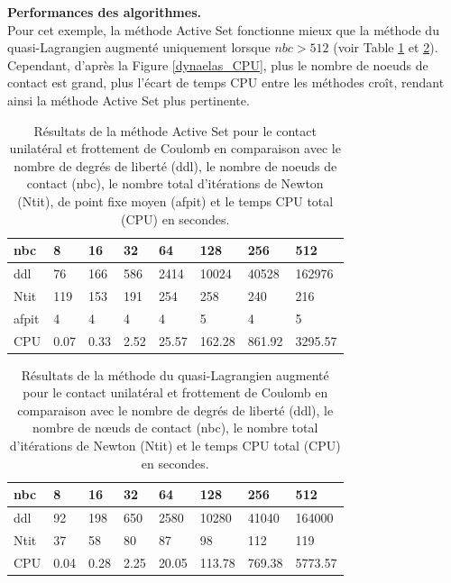\noindent\textbf{Performances des algorithmes.}\\
Pour cet exemple, la méthode Active Set fonctionne mieux que la méthode du quasi-Lagrangien augmenté uniquement lorsque $ nbc> 512 $ (voir Table \ref{tab5_def} et \ref{tab6_def}). Cependant, d'après la Figure \ref{dynaelas_CPU}, plus le nombre de noeuds de contact est grand, plus l'écart de temps CPU entre les méthodes croît, rendant ainsi la méthode Active Set plus pertinente.

\begin{table}[htbp!]
\begin{tabular}{ |p{1.25cm}|p{1.25cm}|p{1.25cm}|p{1.25cm}|p{1.25cm}|p{1.25cm}|p{1.25cm}|p{1.25cm}| }
 \hline \rowcolor{lightgray}
			nbc & 8 & 16 & 32 & 64 & 128 & 256 & 512 \\
			\hline
			ddl & 76 & 166 & 586 & 2414 & 10024 & 40528 & 162976 \\
			Ntit &  119 & 153 & 191 & 254 & 258 & 240 & 216 \\
			afpit &  4 & 4 & 4 & 4 & 5 & 4 & 5 \\
			CPU &  0.07 & 0.33 & 2.52 & 25.57 & 162.28 & 861.92 & 3295.57  \\
\hline
\end{tabular}
	\caption{Résultats de la méthode Active Set pour le contact unilatéral et frottement de Coulomb en comparaison avec le nombre de degrés de liberté (ddl), le nombre de noeuds de contact (nbc), le nombre total d'itérations de Newton (Ntit), de point fixe moyen (afpit) et le temps CPU total (CPU) en secondes.} \label{tab5_def}
\end{table}

\begin{table}[htbp!]
\begin{tabular}{ |p{1.25cm}|p{1.25cm}|p{1.25cm}|p{1.25cm}|p{1.25cm}|p{1.25cm}|p{1.25cm}|p{1.25cm}| }
 \hline \rowcolor{lightgray}
			nbc & 8 & 16 & 32 & 64 & 128 & 256 & 512 \\
			\hline
			ddl & 92 & 198 & 650 & 2580 & 10280 & 41040 & 164000 \\
			Ntit &  37 & 58 & 80 & 87 & 98 & 112 & 119 \\
			CPU &  0.04 & 0.28 & 2.25 & 20.05 & 113.78 & 769.38 & 5773.57  \\
\hline
\end{tabular}
	\caption{Résultats de la méthode du quasi-Lagrangien augmenté pour le contact unilatéral et frottement de Coulomb en comparaison avec le nombre de degrés de liberté (ddl), le nombre de nœuds de contact (nbc), le nombre total d'itérations de Newton (Ntit) et le temps CPU total (CPU) en secondes.} \label{tab6_def}
\end{table}

